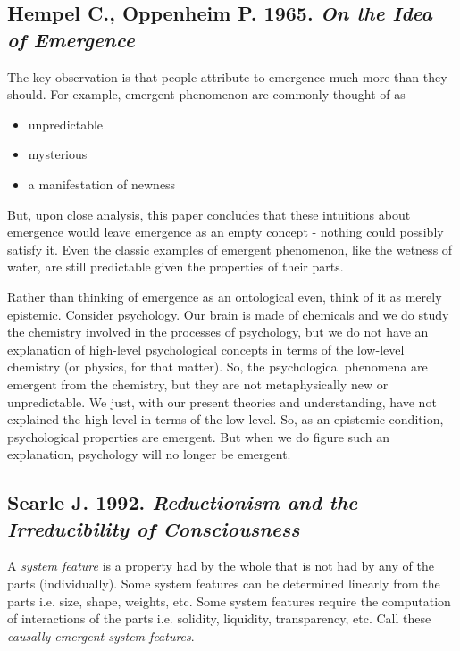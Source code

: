 \documentclass{article}
\newcommand{\ti}[1]{\textit{#1}}
\newcommand{\annbibtitle}[2]{\subsection*{#1. \ti{#2}}}
\begin{document}
\annbibtitle{Hempel C., Oppenheim P. 1965}{On the Idea of Emergence}

The key observation is that people attribute to emergence much more than they should. For example, emergent phenomenon are commonly thought of as

\begin{itemize}
    \item unpredictable
    \item mysterious
    \item a manifestation of newness
\end{itemize}

But, upon close analysis, this paper concludes that these intuitions about emergence would leave emergence as an empty concept - nothing could possibly satisfy it. Even the classic examples of emergent phenomenon, like the wetness of water, are still predictable given the properties of their parts.

Rather than thinking of emergence as an ontological even, think of it as merely epistemic. Consider psychology. Our brain is made of chemicals and we do study the chemistry involved in the processes of psychology, but we do not have an explanation of high-level psychological concepts in terms of the low-level chemistry (or physics, for that matter). So, the psychological phenomena are emergent from the chemistry, but they are not metaphysically new or unpredictable. We just, with our present theories and understanding, have not explained the high level in terms of the low level. So, as an epistemic condition, psychological properties are emergent. But when we do figure such an explanation, psychology will no longer be emergent.

\annbibtitle{Searle J. 1992}{Reductionism and the Irreducibility of Consciousness}

A \ti{system feature} is a property had by the whole that is not had by any of the parts (individually). Some system features can be determined linearly from the parts i.e. size, shape, weights, etc. Some system features require the computation of interactions of the parts i.e. solidity, liquidity, transparency, etc. Call these \ti{causally emergent system features}.
\end{document}

